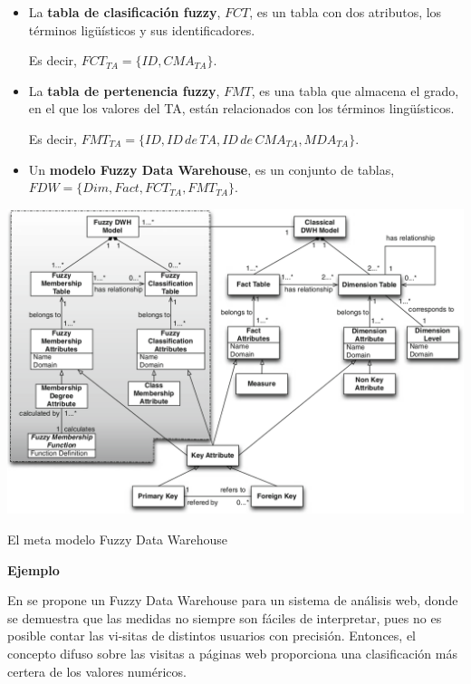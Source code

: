 \documentclass{fancyslides}
\begin{document}
\begin{frame}
\misc
{
\begin{itemize}
  \item \justifying La \textbf{tabla de clasificación fuzzy}, $FCT$, es un tabla con dos atributos, los términos ligüísticos y sus identificadores.
  
  Es decir, $FCT_{TA} = \{ ID, CMA_{TA} \}$.
  \item \justifying La \textbf{tabla de pertenencia fuzzy}, $FMT$, es una tabla que almacena el grado, en el que los valores del TA, están relacionados con los términos lingüísticos.
  
  Es decir, $FMT_{TA} = \{ ID, ID \, de \, TA, ID \, de \, CMA_{TA}, MDA_{TA} \}$.
  
  \item \justifying Un \textbf{modelo Fuzzy Data Warehouse}, es un conjunto de tablas, $FDW = \{Dim, Fact, FCT_{TA}, FMT_{TA} \}$.
\end{itemize}
}
\end{frame}

\begin{frame}
\misc
{

\begin{center}
\includegraphics[scale=0.25]{fuzzy2}

El meta modelo Fuzzy Data Warehouse
\end{center}

}
\end{frame}

\begin{frame}
\misc
{
\textbf{Ejemplo}
\newline

\justifying En \cite{Fasel09} se propone un Fuzzy Data Warehouse para un sistema de análisis web, donde se demuestra que las medidas no siempre son fáciles de interpretar, pues no es posible contar las vi-sitas de distintos usuarios con precisión.
Entonces, el concepto difuso sobre las visitas a páginas web proporciona una clasificación más certera de los valores numéricos.
}
\end{frame}
\end{document}
